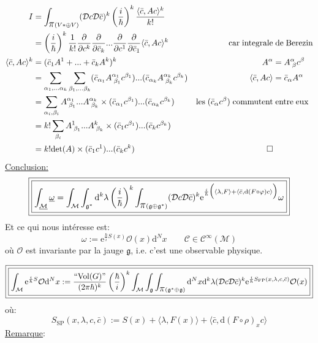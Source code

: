\documentclass[a4paper,11pt]{article}
\renewcommand{\d}{{\mathrm{d}}}
\newcommand{\D}{{\mathcal{D}}}
\newcommand{\e}{{\mathrm{e}}}
\newcommand{\dr}[2]{\frac{\partial {#1}}{\partial{#2}}}
\newcommand{\ppi}{{\mathlarger{\mathlarger{\mathlarger{\pi}}}}}
\begin{document}
\begin{align*}
I &= \int_{\ppi(V*\oplus V)} (\D c\D \bar c)^k \left(\frac i \hbar \right)^k \frac{\langle\bar c,Ac\rangle^k}{k!}&&\\
&= \left( \frac i \hbar \right)^k \frac 1 {k!} \dr{}{c^k}\dr{}{\bar c_k}...\dr{}{c^1}\dr{}{\bar c_1} \langle\bar c, Ac\rangle^k &
\mathrm{car}\;\mathrm{integrale} & \; \mathrm{de}\;\mathrm{Berezin}\\
\langle\bar c, Ac\rangle^k &= (\bar c_1 A^1+ ... + \bar c_k A^k)^k & A^\alpha &= A^\alpha_{\;\beta} c^\beta\\
&= \sum_{\alpha_1, ... \alpha_k} \sum_{\beta_1, ...\beta_k} (\bar c_{\alpha_1} A^{\alpha_1}_{\;\beta_1}c^{\beta_1})...(\bar c_{\alpha_k} A^{\alpha_k}_{\;\beta_k}c^{\beta_k})&
\langle\bar c, Ac\rangle &= \bar c_\alpha A^\alpha\\
&= \sum_{\alpha_i, \beta_i} A^{\alpha_1}_{\;\beta_1}...A^{\alpha_k}_{\;\beta_k} \times (\bar c_{\alpha_1} c^{\beta_1})...(\bar c_{\alpha_k} c^{\beta_k})
& \mathrm{les}\; (\bar c_\alpha c^\beta)\;\mathrm{commutent}&\;\mathrm{entre}\;\mathrm{eux}\\
&= k! \sum_{\beta_i} A^{1}_{\;\beta_1}...A^{k}_{\;\beta_k} \times (\bar c_{1} c^{\beta_1})...(\bar c_{k} c^{\beta_k})\\
&= k! \mathrm{det}(A)\times (\bar c_{1} c^{1})...(\bar c_{k} c^{k})& \Box
\end{align*}
\underline{Conclusion:}
$$\boxed{\boxed{
\int_{\underline{\mathcal M}} \underline \omega = \int_\mathcal M \int_{\mathfrak g^*} \d^k\lambda \left(\frac i \hbar \right)^k \int_{\ppi(\mathfrak g \oplus \mathfrak g^*)} (\D c\D\bar c)^k \e^{\frac i\hbar \Big( \langle \lambda, F\rangle+\langle\bar c, \d(F\circ \varphi) c\rangle \Big)} \omega
}}$$
Et ce qui nous intéresse est:
$$\omega := \e^{\frac\hbar i S(x)} \mathcal{O}(x) \d^N x \quad \quad \mathcal{C}\in\mathcal{C}^\infty(\mathcal{M})$$
où $\mathcal{O}$ est invariante par la jauge $\mathfrak{g}$, i.e. c'est une observable physique.

$$\boxed{\boxed{
\int_\mathcal M \e^{\frac i\hbar S} \mathcal{O} \d^N x := \frac{``\mathrm{Vol}(G)"}{(2\pi\hbar)^k}\left(\frac\hbar i\right)^k \int_\mathcal M \int_\mathfrak g \int_{\ppi(\mathfrak g^*\oplus\mathfrak g)} \d^Nx\d^k\lambda(\D c\D\bar c)^k \e^{\frac i\hbar S_{\mathrm{FP}}(x,\lambda,c,\bar c)}\mathcal{O}(x)
}}$$
où:
$$\boxed{
S_\mathrm{SP}(x,\lambda,c,\bar c):= S(x)+ \langle\lambda,F(x)\rangle + \langle\bar c, \d(F\circ \rho)_x c\rangle
}$$
\underline{Remarque}:
\end{document}
